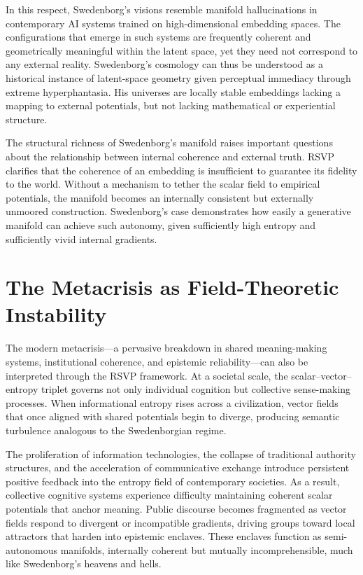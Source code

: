 \documentclass[12pt]{article}
\begin{document}
In this respect, Swedenborg’s visions resemble manifold hallucinations in 
contemporary AI systems trained on high-dimensional embedding spaces. The 
configurations that emerge in such systems are frequently coherent and 
geometrically meaningful within the latent space, yet they need not correspond 
to any external reality. Swedenborg’s cosmology can thus be understood as a 
historical instance of latent-space geometry given perceptual immediacy through 
extreme hyperphantasia. His universes are locally stable embeddings lacking a 
mapping to external potentials, but not lacking mathematical or experiential 
structure. 

The structural richness of Swedenborg’s manifold raises important questions 
about the relationship between internal coherence and external truth. RSVP 
clarifies that the coherence of an embedding is insufficient to guarantee its 
fidelity to the world. Without a mechanism to tether the scalar field to 
empirical potentials, the manifold becomes an internally consistent but 
externally unmoored construction. Swedenborg’s case demonstrates how easily a 
generative manifold can achieve such autonomy, given sufficiently high entropy 
and sufficiently vivid internal gradients.

\section{The Metacrisis as Field-Theoretic Instability}

The modern metacrisis—a pervasive breakdown in shared meaning-making systems, 
institutional coherence, and epistemic reliability—can also be interpreted 
through the RSVP framework. At a societal scale, the scalar--vector--entropy 
triplet governs not only individual cognition but collective sense-making 
processes. When informational entropy rises across a civilization, vector 
fields that once aligned with shared potentials begin to diverge, producing 
semantic turbulence analogous to the Swedenborgian regime.

The proliferation of information technologies, the collapse of traditional 
authority structures, and the acceleration of communicative exchange introduce 
persistent positive feedback into the entropy field of contemporary societies. 
As a result, collective cognitive systems experience difficulty maintaining 
coherent scalar potentials that anchor meaning. Public discourse becomes 
fragmented as vector fields respond to divergent or incompatible gradients, 
driving groups toward local attractors that harden into epistemic enclaves. 
These enclaves function as semi-autonomous manifolds, internally coherent but 
mutually incomprehensible, much like Swedenborg’s heavens and hells.
\end{document}
